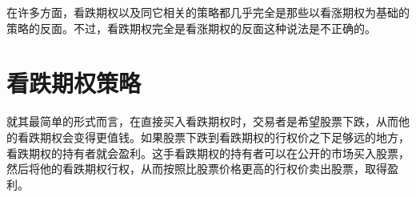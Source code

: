 \documentclass{article}
\begin{document}
在许多方面，看跌期权以及同它相关的策略都几乎完全是那些以看涨期权为基础的策略的反面。不过，看跌期权完全是看涨期权的反面这种说法是不正确的。
\section{看跌期权策略}
就其最简单的形式而言，在直接买入看跌期权时，交易者是希望股票下跌，从而他的看跌期权会变得更值钱。如果股票下跌到看跌期权的行权价之下足够远的地方，看跌期权的持有者就会盈利。这手看跌期权的持有者可以在公开的市场买入股票，然后将他的看跌期权行权，从而按照比股票价格更高的行权价卖出股票，取得盈利。
\end{document}
